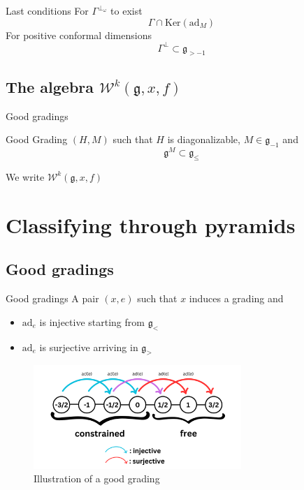 \documentclass{beamer}
\begin{document}
\begin{frame}{Last conditions} \huge
    For $\Gamma^{\perp_\omega}$ to exist
    \begin{equation}
        \Gamma \cap \text{Ker}(\text{ad}_M)
    \end{equation}
    For positive conformal dimensions
    \begin{equation}
        \Gamma ^\perp \subset \mathfrak{g}_{>-1}
    \end{equation}
\end{frame}

\subsection{The algebra $\mathcal{W}^k(\mathfrak{g}, x, f)$}


\begin{frame}{Good gradings} \LARGE
    \begin{alertblock}{Good Grading}
        $(H, M)$ such that $H$ is diagonalizable, $M \in \mathfrak{g}_{-1}$ and 
        \begin{equation}
            \mathfrak{g}^M \subset \mathfrak{g}_{\leq}
        \end{equation}
    \end{alertblock}
    We write $\mathcal{W}^k(\mathfrak{g}, x, f)$
\end{frame}

\section{Classifying through pyramids}
\subsection{Good gradings}


\begin{frame}{Good gradings}
    A pair $(x, e)$ such that $x$ induces a grading and
    \begin{itemize}
        \item $\text{ad}_e$ is injective starting from $\mathfrak{g}_{<}$
        \item $\text{ad}_e$ is surjective arriving in $\mathfrak{g}_{>}$
    \end{itemize}

    \begin{figure}
        \centering
        \includegraphics[width=0.7\textwidth]{goodgrading}
        \caption{Illustration of a good grading}
    \end{figure}
\end{frame}
\end{document}
